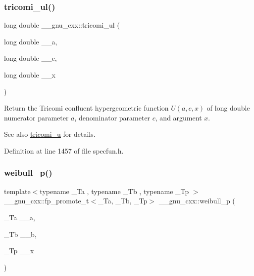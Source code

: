 \subsubsection{\texorpdfstring{tricomi\+\_\+ul()}{tricomi\_ul()}}
{\footnotesize\ttfamily long double \+\_\+\+\_\+gnu\+\_\+cxx\+::tricomi\+\_\+ul (\begin{DoxyParamCaption}\item[{long double}]{\+\_\+\+\_\+a,  }\item[{long double}]{\+\_\+\+\_\+c,  }\item[{long double}]{\+\_\+\+\_\+x }\end{DoxyParamCaption})\hspace{0.3cm}{\ttfamily [inline]}}

Return the Tricomi confluent hypergeometric function $ U(a,c,x) $ of {\ttfamily long double} numerator parameter $ a $, denominator parameter $ c $, and argument $ x $.

\begin{DoxySeeAlso}{See also}
\hyperlink{group__gnu__math__spec__func_gaf51a13fad85006e4d65c5b117e49f7d8}{tricomi\+\_\+u} for details. 
\end{DoxySeeAlso}


Definition at line 1457 of file specfun.\+h.

\mbox{\label{group__gnu__math__spec__func_ga9afb3065fea6ef3a91126d67f726f7af}} 
\subsubsection{\texorpdfstring{weibull\+\_\+p()}{weibull\_p()}}
{\footnotesize\ttfamily template$<$typename \+\_\+\+Ta , typename \+\_\+\+Tb , typename \+\_\+\+Tp $>$ \\
\+\_\+\+\_\+gnu\+\_\+cxx\+::fp\+\_\+promote\+\_\+t$<$\+\_\+\+Ta, \+\_\+\+Tb, \+\_\+\+Tp$>$ \+\_\+\+\_\+gnu\+\_\+cxx\+::weibull\+\_\+p (\begin{DoxyParamCaption}\item[{\+\_\+\+Ta}]{\+\_\+\+\_\+a,  }\item[{\+\_\+\+Tb}]{\+\_\+\+\_\+b,  }\item[{\+\_\+\+Tp}]{\+\_\+\+\_\+x }\end{DoxyParamCaption})\hspace{0.3cm}{\ttfamily [inline]}}



